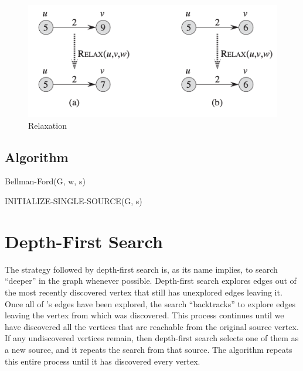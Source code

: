 \begin{figure}[H]
    \centering
    \includegraphics[width=\textwidth]{assets/relaxation.png}
    \caption{Relaxation}
    \label{fig:relaxation}
\end{figure}

\newpage
\subsection*{Algorithm}
\begin{algorithm}
    \caption{Bellman-Ford(G, w, s)}
    INITIALIZE-SINGLE-SOURCE(G, s) \\
\end{algorithm}





\section{Depth-First Search}

The strategy followed by depth-first search is, as its name implies, to search
“deeper” in the graph whenever possible. Depth-first search explores edges out
of the most recently discovered vertex that still has unexplored edges leaving it.
Once all of ’s edges have been explored, the search “backtracks” to explore edges
leaving the vertex from which was discovered. This process continues until we
have discovered all the vertices that are reachable from the original source vertex.
If any undiscovered vertices remain, then depth-first search selects one of them as
a new source, and it repeats the search from that source. The algorithm repeats this
entire process until it has discovered every vertex.

